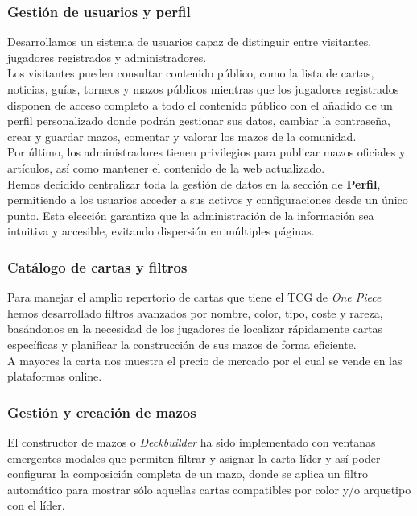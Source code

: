\documentclass[10pt]{article}
\begin{document}
	\subsubsection{Gestión de usuarios y perfil}
	Desarrollamos un sistema de usuarios capaz de distinguir entre visitantes, jugadores registrados y administradores.\\
	 Los visitantes pueden consultar contenido público, como la lista de cartas, noticias, guías, torneos y mazos públicos mientras que los jugadores registrados disponen de acceso completo a todo el contenido público con el añadido de un perfil personalizado donde podrán gestionar sus datos, cambiar la contraseña, crear y guardar mazos, comentar y valorar los mazos de la comunidad. \\
	 Por último, los administradores tienen privilegios para publicar mazos oficiales y artículos, así como mantener el contenido de la web actualizado.\\
	
	Hemos decidido centralizar toda la gestión de datos en la sección de \textbf{Perfil}, permitiendo a los usuarios acceder a sus activos y configuraciones desde un único punto. Esta elección garantiza que la administración de la información sea intuitiva y accesible, evitando dispersión en múltiples páginas.
	
	\subsubsection{Catálogo de cartas y filtros}
	Para manejar el amplio repertorio de cartas que tiene el TCG de \textit{One Piece} hemos desarrollado filtros avanzados por nombre, color, tipo, coste y rareza, basándonos en la necesidad de los jugadores de localizar rápidamente cartas específicas y planificar la construcción de sus mazos de forma eficiente.\\
	A mayores la carta nos muestra el precio de mercado por el cual se vende en las plataformas online.
	
	\subsubsection{Gestión y creación de mazos}
	El constructor de mazos o \textit{Deckbuilder} ha sido implementado con ventanas emergentes modales que permiten filtrar y asignar la carta líder y así poder configurar la composición completa de un mazo, donde se aplica un filtro automático para mostrar sólo aquellas cartas compatibles por color y/o arquetipo con el líder.\\
	
\end{document}
